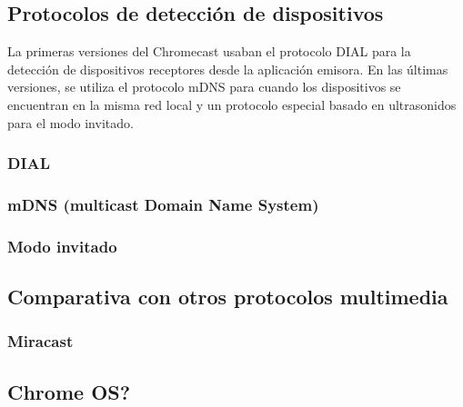 \subsection{Protocolos de detección de dispositivos}

La primeras versiones del Chromecast usaban el protocolo DIAL para la detección de dispositivos receptores desde la aplicación emisora.
En las últimas versiones, se utiliza el protocolo mDNS para cuando los dispositivos se encuentran en la misma red local y un protocolo especial basado en ultrasonidos para el modo invitado.

\subsubsection{DIAL}


\subsubsection{mDNS (multicast Domain Name System)}


\subsubsection{Modo invitado}


\subsection{Comparativa con otros protocolos multimedia}

\subsubsection{Miracast}


\subsection{Chrome OS?}
